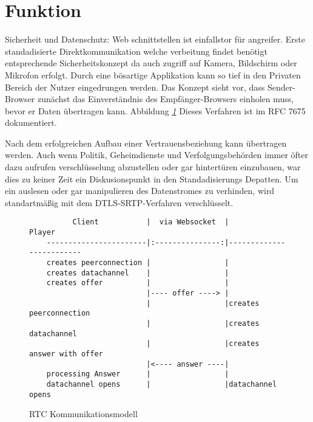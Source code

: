 \section{Funktion}



Sicherheit und Datenschutz:
Web schnittstellen ist einfallstor für angreifer.
Erste standadisierte Direktkommunikation welche verbeitung findet benötigt entsprechende Sicherheitskonzept da auch zugriff auf Kamera, Bildschirm oder Mikrofon erfolgt. Durch eine bösartige Applikation kann so tief in den Privaten Bereich der Nutzer eingedrungen werden. Das Konzept sieht vor, dass Sender-Browser zunächst das Einverständnis des Empfänger-Browsers einholen muss, bevor er Daten übertragen kann. Abbildung\textit{ \ref{fig:RTC Kommunikationsmodell} } Dieses Verfahren ist im RFC 7675 dokumentiert.

Nach dem erfolgreichen Aufbau einer Vertrauensbeziehung kann übertragen werden. Auch wenn Politik, Geheimdienste und Verfolgungsbehörden immer öfter dazu aufrufen verschlüsselung abzustellen oder gar hintertüren einzubauen, war dies zu keiner Zeit ein Diskusionspunkt in den Standadisierungs Depatten. Um ein auslesen oder gar manipulieren des Datenstromes zu verhinden, wird standartmäßig mit dem DTLS-SRTP-Verfahren verschlüsselt. 



\begin{figure}[h]
\centering
\begin{varwidth}{\linewidth}
\begin{verbatim}
	      Client           |  via Websocket  |         Player        
	-----------------------|:---------------:|-------------------------
	creates peerconnection |                 |                         
	creates datachannel    |                 |                         
	creates offer          |                 |                         
	                       |---- offer ----> |                         
	                       |                 |creates peerconnection   
	                       |                 |creates datachannel      
	                       |                 |creates answer with offer
	                       |<---- answer ----|                         
	processing Answer      |                 |                         
	datachannel opens      |                 |datachannel opens 
\end{verbatim}
\end{varwidth}
\caption{RTC Kommunikationsmodell}
\label{fig:RTC Kommunikationsmodell}
\end{figure}



















